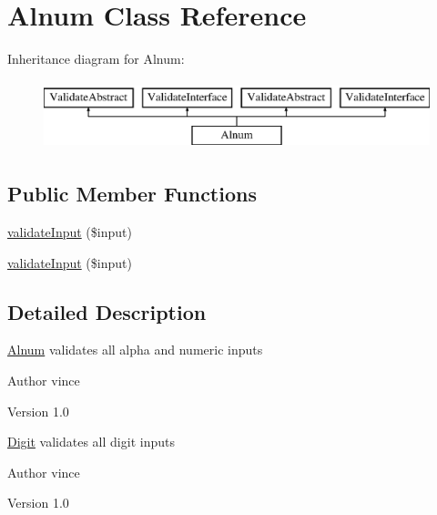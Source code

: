 \hypertarget{class_anemo_1_1_validate_1_1_adapter_1_1_alnum}{
\section{Alnum Class Reference}
\label{class_anemo_1_1_validate_1_1_adapter_1_1_alnum}
}
Inheritance diagram for Alnum:\begin{figure}[H]
\begin{center}
\leavevmode
\includegraphics[height=2.000000cm]{class_anemo_1_1_validate_1_1_adapter_1_1_alnum}
\end{center}
\end{figure}
\subsection*{Public Member Functions}
\begin{DoxyCompactItemize}
\item 
\hyperlink{class_anemo_1_1_validate_1_1_adapter_1_1_alnum_aaa5a5ce40dbb70cc1caa4482c0b7aa33}{validateInput} (\$input)
\item 
\hyperlink{class_anemo_1_1_validate_1_1_adapter_1_1_alnum_aaa5a5ce40dbb70cc1caa4482c0b7aa33}{validateInput} (\$input)
\end{DoxyCompactItemize}


\subsection{Detailed Description}
\hyperlink{class_anemo_1_1_validate_1_1_adapter_1_1_alnum}{Alnum} validates all alpha and numeric inputs \begin{DoxyAuthor}{Author}
vince 
\end{DoxyAuthor}
\begin{DoxyVersion}{Version}
1.0
\end{DoxyVersion}
\hyperlink{namespace_anemo_1_1_validate_1_1_adapter_1_1_digit}{Digit} validates all digit inputs \begin{DoxyAuthor}{Author}
vince 
\end{DoxyAuthor}
\begin{DoxyVersion}{Version}
1.0 
\end{DoxyVersion}


